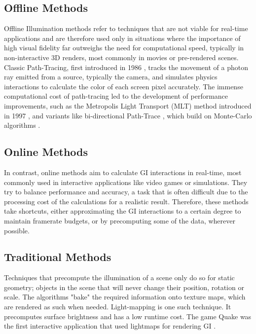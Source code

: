 \subsection{Offline Methods}
Offline Illumination methods refer to techniques that are not viable for real-time applications and are therefore used only in situations where the importance of high visual fidelity far outweighs the need for computational speed, typically in non-interactive 3D renders, most commonly in movies or pre-rendered scenes. Classic Path-Tracing, first introduced in 1986 \parencite{Kajiya1986}, tracks the movement of a photon ray emitted from a source, typically the camera, and simulates physics interactions to calculate the color of each screen pixel accurately. The immense computational cost of path-tracing led to the development of performance improvements, such as the Metropolis Light Transport (MLT) method introduced in 1997 \parencite{Veach1997}, and variants like bi-directional Path-Trace \parencite{Lafortune1993}, which build on Monte-Carlo algorithms \parencite{Lafortune1996}.

\subsection{Online Methods} %
In contrast, online methods aim to calculate GI interactions in real-time, most commonly used in interactive applications like video games or simulations. They try to balance performance and accuracy, a task that is often difficult due to the processing cost of the calculations for a realistic result. Therefore, these methods take shortcuts, either approximating the GI interactions to a certain degree to maintain framerate budgets, or by precomputing some of the data, wherever possible.

\subsection*{Traditional Methods} %
Techniques that precompute the illumination of a scene only do so for static geometry; objects in the scene that will never change their position, rotation or scale. The algorithms "bake" the required information onto texture maps, which are rendered as such when needed. Light-mapping is one such technique. It precomputes surface brightness and has a low runtime cost. The game Quake was the first interactive application that used lightmaps for rendering GI \parencite{WikiLightmaps}.

